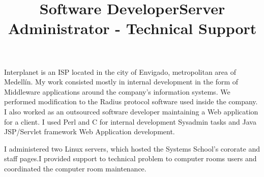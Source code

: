 \begin{resume}
\title{\textbf{Software Developer}}
\begin{position}
Interplanet is an  ISP located in the city of Envigado, metropolitan area of Medell\'{i}n.
My work consisted mostly  in internal development in the form of
Middleware applications  around the company's information systems.
We performed modification to the Radius protocol software used inside the company.
I also worked as an outsourced software developer maintaining a Web application
for a client.  I used Perl and C for internal development Sysadmin
tasks and  Java JSP/Servlet framework Web Application development.
\end{position}
\newline
\newline
\newline
\newline
\newline
\newline
\newline

\title{\textbf{Server Administrator - Technical Support}}
\begin{position}
I administered two Linux servers, which hosted the Systems School's
cororate and staff pages.I provided support to technical problem 
to computer rooms users and coordinated the computer room maintenance.
\end{position}
\newline






\end{resume}
